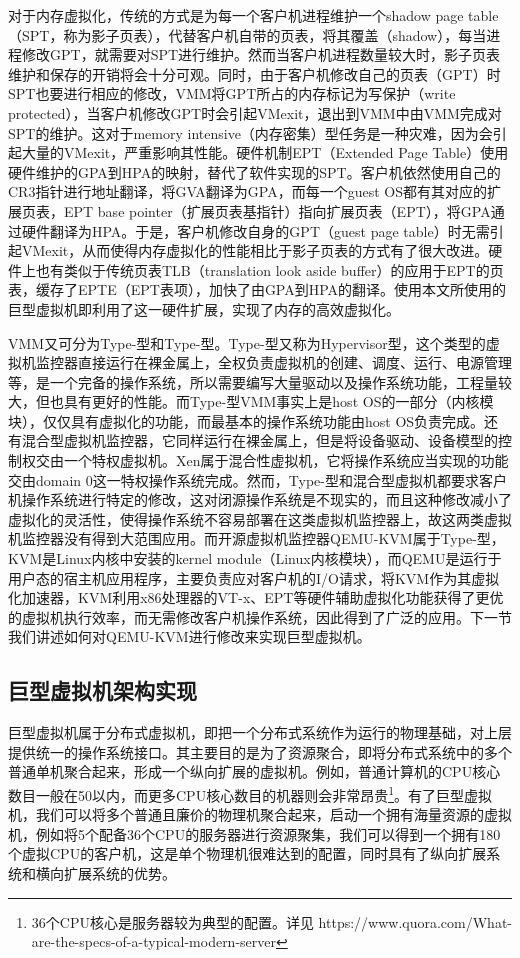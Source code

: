 对于内存虚拟化，传统的方式是为每一个客户机进程维护一个shadow page table（SPT，称为影子页表），代替客户机自带的页表，将其覆盖（shadow），每当进程修改GPT，就需要对SPT进行维护。然而当客户机进程数量较大时，影子页表维护和保存的开销将会十分可观。同时，由于客户机修改自己的页表（GPT）时SPT也要进行相应的修改，VMM将GPT所占的内存标记为写保护（write protected），当客户机修改GPT时会引起VMexit，退出到VMM中由VMM完成对SPT的维护。这对于memory intensive（内存密集）型任务是一种灾难，因为会引起大量的VMexit，严重影响其性能。硬件机制EPT（Extended Page Table）使用硬件维护的GPA到HPA的映射，替代了软件实现的SPT。客户机依然使用自己的CR3指针进行地址翻译，将GVA翻译为GPA，而每一个guest OS都有其对应的扩展页表，EPT base pointer（扩展页表基指针）指向扩展页表（EPT），将GPA通过硬件翻译为HPA。于是，客户机修改自身的GPT（guest page table）时无需引起VMexit，从而使得内存虚拟化的性能相比于影子页表的方式有了很大改进。硬件上也有类似于传统页表TLB（translation look aside buffer）的应用于EPT的页表，缓存了EPTE（EPT表项），加快了由GPA到HPA的翻译。使用本文所使用的巨型虚拟机即利用了这一硬件扩展，实现了内存的高效虚拟化。

VMM又可分为Type-\uppercase\expandafter{}型和Type-\uppercase\expandafter{}型。Type-\uppercase\expandafter{}型又称为Hypervisor型，这个类型的虚拟机监控器直接运行在裸金属上，全权负责虚拟机的创建、调度、运行、电源管理等，是一个完备的操作系统，所以需要编写大量驱动以及操作系统功能，工程量较大，但也具有更好的性能。而Type-\uppercase\expandafter{}型VMM事实上是host OS的一部分（内核模块），仅仅具有虚拟化的功能，而最基本的操作系统功能由host OS负责完成。还有混合型虚拟机监控器，它同样运行在裸金属上，但是将设备驱动、设备模型的控制权交由一个特权虚拟机。Xen属于混合性虚拟机，它将操作系统应当实现的功能交由domain 0这一特权操作系统完成。然而，Type-\uppercase\expandafter{}型和混合型虚拟机都要求客户机操作系统进行特定的修改，这对闭源操作系统是不现实的，而且这种修改减小了虚拟化的灵活性，使得操作系统不容易部署在这类虚拟机监控器上，故这两类虚拟机监控器没有得到大范围应用。而开源虚拟机监控器QEMU-KVM属于Type-\uppercase\expandafter{}型，KVM\cite{KVM}是Linux内核中安装的kernel module（Linux内核模块），而QEMU\cite{QEMU}是运行于用户态的宿主机应用程序，主要负责应对客户机的I/O请求，将KVM作为其虚拟化加速器，KVM利用x86处理器的VT-x、EPT等硬件辅助虚拟化功能获得了更优的虚拟机执行效率，而无需修改客户机操作系统，因此得到了广泛的应用。下一节我们讲述如何对QEMU-KVM进行修改来实现巨型虚拟机。

\subsection{巨型虚拟机架构实现}
巨型虚拟机属于分布式虚拟机，即把一个分布式系统作为运行的物理基础，对上层提供统一的操作系统接口。其主要目的是为了资源聚合，即将分布式系统中的多个普通单机聚合起来，形成一个纵向扩展的虚拟机。例如，普通计算机的CPU核心数目一般在50以内，而更多CPU核心数目的机器则会非常昂贵\footnote{36个CPU核心是服务器较为典型的配置。详见 https://www.quora.com/What-are-the-specs-of-a-typical-modern-server}。有了巨型虚拟机，我们可以将多个普通且廉价的物理机聚合起来，启动一个拥有海量资源的虚拟机，例如将5个配备36个CPU的服务器进行资源聚集，我们可以得到一个拥有180个虚拟CPU的客户机，这是单个物理机很难达到的配置，同时具有了纵向扩展系统和横向扩展系统的优势。

